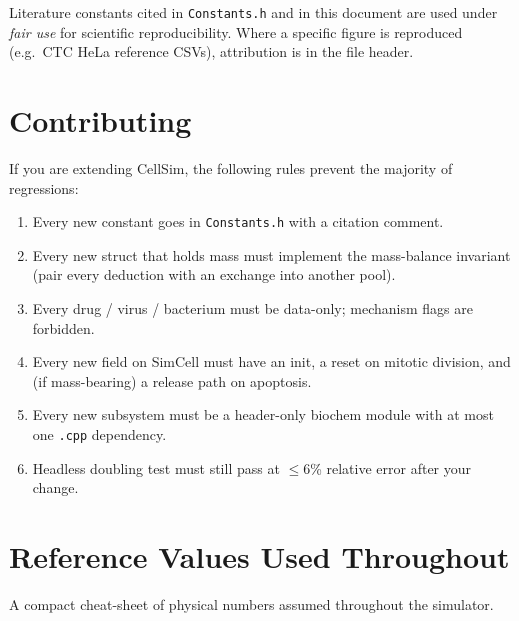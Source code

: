 \documentclass[11pt,letterpaper,twoside,openany]{book}
\newcommand{\code}[1]{\texttt{#1}}
\newcommand{\file}[1]{\texttt{\small#1}}
\begin{document}
Literature constants cited in \file{Constants.h} and in this
document are used under \emph{fair use} for scientific
reproducibility. Where a specific figure is reproduced (e.g.\ CTC
HeLa reference CSVs), attribution is in the file header.

\chapter{Contributing}
\label{ch:contrib}

If you are extending CellSim, the following rules prevent the
majority of regressions:
\begin{enumerate}
  \item Every new constant goes in \file{Constants.h} with a
        citation comment.
  \item Every new struct that holds mass must implement the
        mass-balance invariant (pair every deduction with an
        exchange into another pool).
  \item Every drug / virus / bacterium must be data-only;
        mechanism flags are forbidden.
  \item Every new field on SimCell must have an init, a reset on
        mitotic division, and (if mass-bearing) a release path on
        apoptosis.
  \item Every new subsystem must be a header-only biochem module
        with at most one \code{.cpp} dependency.
  \item Headless doubling test must still pass at $\leq$6\%
        relative error after your change.
\end{enumerate}

\chapter{Reference Values Used Throughout}
\label{ch:refvals}

A compact cheat-sheet of physical numbers assumed throughout the
simulator.
\end{document}
